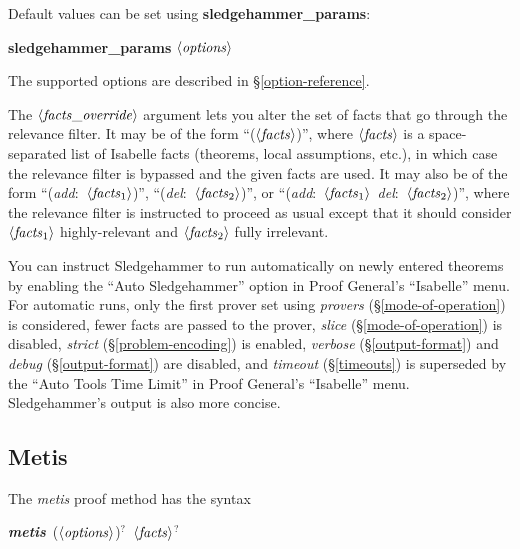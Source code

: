 \documentclass[a4paper,12pt]{article}
\def\qty#1{\ensuremath{\left<\mathit{#1\/}\right>}}
\begin{document}
Default values can be set using \textbf{sledgehammer\_\allowbreak params}:

\prew
\textbf{sledgehammer\_params} \qty{options}
\postw

The supported options are described in \S\ref{option-reference}.

The \qty{facts\_override} argument lets you alter the set of facts that go
through the relevance filter. It may be of the form ``(\qty{facts})'', where
\qty{facts} is a space-separated list of Isabelle facts (theorems, local
assumptions, etc.), in which case the relevance filter is bypassed and the given
facts are used. It may also be of the form ``(\textit{add}:\ \qty{facts\/_{\mathrm{1}}})'',
``(\textit{del}:\ \qty{facts\/_{\mathrm{2}}})'', or ``(\textit{add}:\ \qty{facts\/_{\mathrm{1}}}\
\textit{del}:\ \qty{facts\/_{\mathrm{2}}})'', where the relevance filter is instructed to
proceed as usual except that it should consider \qty{facts\/_{\mathrm{1}}}
highly-relevant and \qty{facts\/_{\mathrm{2}}} fully irrelevant.

You can instruct Sledgehammer to run automatically on newly entered theorems by
enabling the ``Auto Sledgehammer'' option in Proof General's ``Isabelle'' menu.
For automatic runs, only the first prover set using \textit{provers}
(\S\ref{mode-of-operation}) is considered, fewer facts are passed to the prover,
\textit{slice} (\S\ref{mode-of-operation}) is disabled, \textit{strict}
(\S\ref{problem-encoding}) is enabled, \textit{verbose} (\S\ref{output-format})
and \textit{debug} (\S\ref{output-format}) are disabled, and \textit{timeout}
(\S\ref{timeouts}) is superseded by the ``Auto Tools Time Limit'' in Proof
General's ``Isabelle'' menu. Sledgehammer's output is also more concise.

\subsection{Metis}

The \textit{metis} proof method has the syntax

\prew
\textbf{\textit{metis}}~(\qty{options})${}^?$~\qty{facts}${}^?$
\postw
\end{document}
